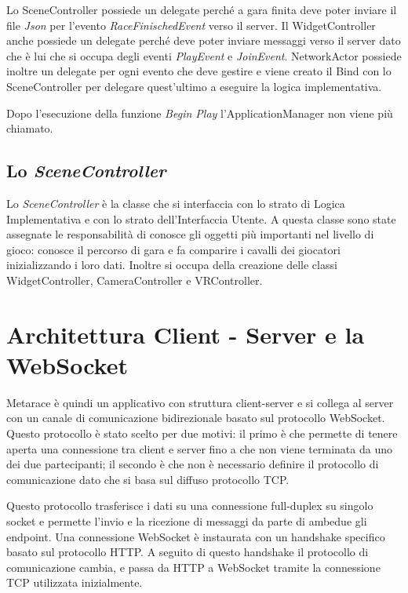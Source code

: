    Lo SceneController possiede un delegate perché a gara finita deve poter inviare il file \textit{Json} per l'evento \textit{RaceFinischedEvent} verso il server.
    Il WidgetController anche possiede un delegate perché deve poter inviare messaggi verso il server dato che è lui che si occupa degli eventi \textit{PlayEvent} e \textit{JoinEvent}.
    NetworkActor possiede inoltre un delegate per ogni evento che deve gestire e viene creato il Bind con lo SceneController per delegare quest'ultimo a eseguire la logica implementativa.

    Dopo l'esecuzione della funzione \textit{Begin Play} l'ApplicationManager non viene più chiamato.

    \subsection{Lo \textit{SceneController}}

    Lo \textit{SceneController} è la classe che si interfaccia con lo strato di Logica Implementativa e con lo strato dell'Interfaccia Utente.
    A questa classe sono state assegnate le responsabilità di conosce gli oggetti più importanti nel livello di gioco: conosce il percorso di gara e fa comparire i cavalli dei giocatori inizializzando i loro dati.
    Inoltre si occupa della creazione delle classi WidgetController, CameraController e VRController.

\section{Architettura Client - Server e la WebSocket}

Metarace è quindi un applicativo con struttura client-server e si collega al server con un canale di comunicazione bidirezionale basato sul protocollo WebSocket.
%
Questo protocollo è stato scelto per due motivi: il primo è che permette di tenere aperta una connessione tra client e server fino a che non viene terminata da uno dei due partecipanti; il secondo è che non è necessario definire il protocollo di comunicazione dato che si basa sul diffuso protocollo TCP.

Questo protocollo trasferisce i dati su una connessione full-duplex su singolo socket e permette l'invio e la ricezione di messaggi da parte di ambedue gli endpoint. 
%
Una connessione WebSocket è instaurata con un handshake specifico basato sul protocollo HTTP.
%
A seguito di questo handshake il protocollo di comunicazione cambia, e passa da HTTP a WebSocket tramite la connessione TCP utilizzata inizialmente. 

